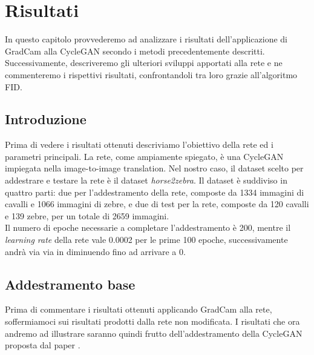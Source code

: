 \chapter{Risultati}
In questo capitolo provvederemo ad analizzare i risultati dell'applicazione di GradCam alla CycleGAN secondo i metodi precedentemente descritti. Successivamente, descriveremo gli ulteriori sviluppi apportati alla rete e ne commenteremo i rispettivi risultati, confrontandoli tra loro grazie all'algoritmo FID.

\section{Introduzione}
Prima di vedere i risultati ottenuti descriviamo l'obiettivo della rete ed i parametri principali. La rete, come ampiamente spiegato, è una CycleGAN impiegata nella image-to-image translation. Nel nostro caso, il dataset scelto per addestrare e testare la rete è il dataset \emph{horse2zebra}. Il dataset è suddiviso in quattro parti: due per l'addestramento della rete, composte da 1334 immagini di cavalli e 1066 immagini di zebre, e due di test per la rete, composte da 120 cavalli e 139 zebre, per un totale di 2659 immagini.
\\Il numero di epoche necessarie a completare l'addestramento è 200, mentre il \emph{learning rate} della rete vale 0.0002 per le prime 100 epoche, successivamente andrà via via in diminuendo fino ad arrivare a 0.


\section{Addestramento base}
Prima di commentare i risultati ottenuti applicando GradCam alla rete, soffermiamoci sui risultati prodotti dalla rete non modificata. I risultati che ora andremo ad illustrare saranno quindi frutto dell'addestramento della CycleGAN proposta dal paper \cite{Zhu_2017_ICCV}. 
